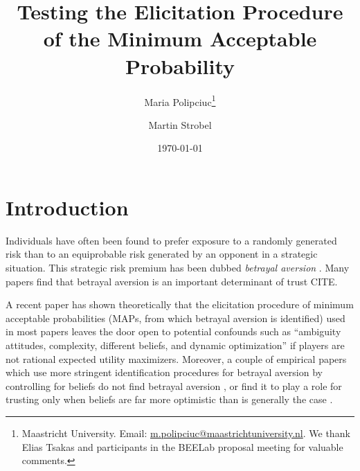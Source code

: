 
\title{Testing the Elicitation Procedure \\ of the Minimum Acceptable Probability}
\author{Maria Polipciuc\thanks{Maastricht University. Email: \url{m.polipciuc@maastrichtuniversity.nl}. We thank Elias Tsakas and participants in the BEELab proposal meeting for valuable comments.} \and Martin Strobel\footnotemark[1]}
\date{\today	\vspace{1cm}}
\titlepage



\begin{titlepage}
\clearpage
\maketitle
\thispagestyle{empty}


\begin{abstract}

\end{abstract}
\end{titlepage}


\section{Introduction}\label{sec:intro}
Individuals have often been found to prefer exposure to a randomly generated risk than to an equiprobable risk generated by an opponent in a strategic situation.
This strategic risk premium has been dubbed \textit{betrayal aversion} \citep{Bohnet2004}.
Many papers find that betrayal aversion is an important determinant of trust CITE.

A recent paper has shown theoretically that the elicitation procedure of minimum acceptable probabilities (MAPs, from which betrayal aversion is identified) used in most papers leaves the door open to potential confounds such as ``ambiguity attitudes, complexity, different beliefs, and dynamic optimization'' \citep{Li2020a} if players are not rational expected utility maximizers.
Moreover, a couple of empirical papers which use more stringent identification procedures for betrayal aversion by controlling for beliefs do not find betrayal aversion \citep{Fetchenhauer2012,Polipciuc2020}, or find it to play a role for trusting only when beliefs are far more optimistic than is generally the case \citep{Engelmann2021}.

